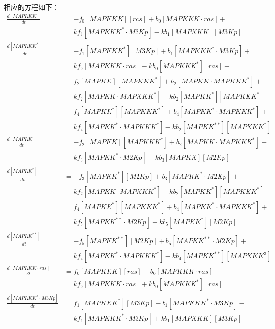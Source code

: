 相应的方程如下：
\small
\begin{equation*}
  \begin{align*}
    \frac{d[MAPKKK]}{dt} &= -f_{0}[MAPKKK][ras] + b_{0}[MAPKKK\cdot{}ras] +\\
    &\phantom{=} kf_{1}[MAPKKK^{*}\cdot{}M3Kp] - kb_{1}[MAPKKK][M3Kp]\\
    \frac{d[MAPKKK^{*}]}{dt} &= -f_{1}[MAPKKK^{*}][M3Kp] + b_{1}[MAPKKK^{*}\cdot{}M3Kp] +\\
    &\phantom{=} kf_{0}[MAPKKK\cdot{}ras] - kb_{0}[MAPKKK^{*}][ras] -\\
    &\phantom{=} f_{2}[MAPKK][MAPKKK^{*}] + b_{2}[MAPKK\cdot{}MAPKKK^{*}] +\\
    &\phantom{=} kf_{2}[MAPKK\cdot{}MAPKKK^{*}] - kb_{2}[MAPKK^{*}][MAPKKK^{*}] -\\
    &\phantom{=} f_{4}[MAPKK^{*}][MAPKKK^{*}] + b_{4}[MAPKK^{*}\cdot{}MAPKKK^{*}] +\\
    &\phantom{=} kf_{4}[MAPKK^{*}\cdot{}MAPKKK^{*}] - kb_{2}[MAPKK^{**}][MAPKKK^{*}]\\
    \frac{d[MAPKK]}{dt} &= -f_{2}[MAPKK][MAPKKK^{*}] + b_{2}[MAPKK\cdot{}MAPKKK^{*}] +\\
    &\phantom{=} kf_{3}[MAPKK^{*}\cdot{}M2Kp] - kb_{3}[MAPKK][M2Kp]\\
    \frac{d[MAPKK^{*}]}{dt} &= -f_{3}[MAPKK^{*}][M2Kp] + b_{3}[MAPKK^{*}\cdot{}M2Kp] +\\
    &\phantom{=} kf_{2}[MAPKK\cdot{}MAPKKK^{*}] - kb_{2}[MAPKK^{*}][MAPKKK^{*}] -\\
    &\phantom{=} f_{4}[MAPKK^{*}][MAPKKK^{*}] + b_{4}[MAPKK^{*}\cdot{}MAPKKK^{*}] +\\
    &\phantom{=} kf_{5}[MAPKK^{**}\cdot{}M2Kp] - kb_{5}[MAPKK^{*}][M2Kp]\\
    \frac{d[MAPKK^{**}]}{dt} &= -f_{5}[MAPKK^{**}][M2Kp] + b_{5}[MAPKK^{**}\cdot{}M2Kp] +\\
    &\phantom{=} kf_{4}[MAPKK^{*}\cdot{}MAPKKK^{*}] - kb_{4}[MAPKK^{**}][MAPKKK^{3}]\\ 
    \frac{d[MAPKKK\cdot{}ras]}{dt} &= f_{0}[MAPKKK][ras] - b_{0}[MAPKKK\cdot{}ras] -\\
    &\phantom{=} kf_{0}[MAPKKK\cdot{}ras] + kb_{0}[MAPKKK^{*}][ras]\\
    \frac{d[MAPKKK^{*}\cdot{}M3Kp]}{dt} &= f_{1}[MAPKKK^{*}][M3Kp] - b_{1}[MAPKKK^{*}\cdot{}M3Kp] -\\
    &\phantom{=} kf_{1}[MAPKKK^{*}\cdot{}M3Kp] + kb_{1}[MAPKKK][M3Kp]\\

\end{align*}
\end{equation*}
